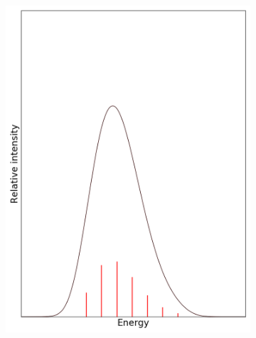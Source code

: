 \documentclass[12pt, fleqn]{beamer}
\begin{document}
\begin{frame}
\begin{overlayarea}{\textwidth}{14cm}
{\begin{figure}[h!]
\begin{subfigure}[b]{0.45\linewidth}
                    \includegraphics[width=\linewidth]{fc_sp/sp_6.png}
                \end{subfigure}
            \end{figure}
        }
\end{overlayarea}
\end{frame}
\end{document}
